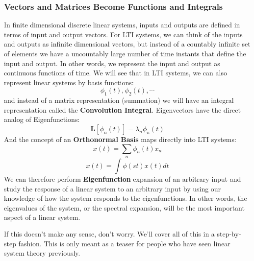 \subsubsection{Vectors and Matrices Become Functions and Integrals}
 In finite dimensional discrete linear systems, inputs and outputs are defined in terms of input and output vectors.  For LTI systems, we can think of the inputs and outputs as infinite dimensional vectors, but instead of a countably infinite set of elements we have a uncountably large number of time instants that define the input and output.  In other words, we represent the input and output as continuous functions of time.   We will see that in LTI systems, we can also represent linear systems by basis functions:
    \begin{equation}
        \phi_1(t), \phi_2(t), \cdots
    \end{equation}
and instead of a matrix representation (summation) we will have an integral representation called the \textbf{Convolution Integral}.  Eigenvectors have the direct analog of Eigenfunctions:
    \begin{equation}
        \mathbf{L} [  \phi_n(t)  ] = \lambda_n  \phi_n(t)
    \end{equation}
And the concept of an \textbf{Orthonormal Basis} maps directly into LTI systems:
    \begin{equation}
        x(t) = \sum_n \phi_n(t) x_n
    \end{equation}
    \begin{equation}
        x(t) = \int \phi(s t) x(t) dt
    \end{equation}
We can therefore perform \textbf{Eigenfunction} expansion of an arbitrary input and study the response of a linear system to an arbitrary input by using our knowledge of how the system responds to the eigenfunctions.  In other words, the eigenvalues of the system, or the spectral expansion, will be the most important aspect of a linear system.

If this doesn't make any sense, don't worry.  We'll cover all of this in a step-by-step fashion. This is only meant as a teaser for people who have seen linear system theory previously. 
